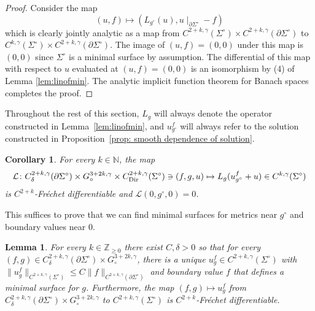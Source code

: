 \documentclass[11pt]{amsart}
\newtheorem{Lemma}[Theorem]{Lemma}
\newtheorem{Corollary}[Theorem]{Corollary}
\theoremstyle{definition}
\numberwithin{equation}{section}
\newcommand{\norm}[1]{\lVert #1 \rVert}         %
\newcommand{\p}{\partial}
\begin{document}
\begin{proof}
Consider the map 
$$(u,f) \mapsto (L_{g^\circ}(u), u\mid_{\partial \Sigma^\circ} - f)$$
which is clearly jointly analytic as a map from $C^{2+k,\gamma}(\Sigma^\circ)\times C^{2+k,\gamma}(\partial \Sigma^\circ)$ to $C^{k,\gamma}(\Sigma^\circ)\times C^{2+k,\gamma}(\partial \Sigma^\circ)$. The image of $(u,f) = (0,0)$ under this map is $(0,0)$ since $\Sigma^\circ$ is a minimal surface by assumption. The differential of this map with respect to $u$ evaluated at $(u,f) = (0,0)$ is an isomorphism by (4) of Lemma \ref{lem:linofmin}. The analytic implicit function theorem for Banach spaces \cite[p. 1081]{zbMATH03230715} completes the proof.
\end{proof}


Throughout the rest of this section, $L_{g}$ will always denote the operator constructed in Lemma~\ref{lem:linofmin}, and $u^f_{g^\circ}$ will always refer to the solution constructed in Proposition~\ref{prop: smooth dependence of solution}. 
\begin{Corollary}
\label{cor: functional is smooth}
For every $k\in\mathbb{N}$, the map
	\[
		\mathcal{L} \colon C^{2+k,\gamma}_{\delta}(\partial\Sigma^\circ) \times G^{3+2k,\gamma}_\circ \times C_{\rm Dir}^{2+k,\gamma}(\Sigma^\circ) \ni (f, g, u) \mapsto L_{g}(u_{g^\circ}^f + u)\in C^{k,\gamma}(\Sigma^\circ)
	\]
	is $C^{2+k}$-Fr\'echet differentiable and $\mathcal L(0, g^\circ, 0)=0$.
\end{Corollary}

This suffices to prove that we can find minimal surfaces for metrics near $g^\circ$ and boundary values near $0$.
\begin{Lemma}
\label{lem: smooth dependence of sol}
For every $k\in\mathbb{Z}_{\geq 0}$ there exist $C,\delta>0$ so that for every $(f,g)\in C^{2+k,\gamma}_{\delta}(\partial\Sigma^\circ) \times G^{3+2k,\gamma}_\circ$, there is a unique $u^f_{g} \in C^{2+k,\gamma}(\Sigma^\circ)$ with $\norm{u^f_{g}}_{C^{2+k,\gamma}(\Sigma^\circ)}\leq C\norm{f}_{C^{2+k,\gamma}(\p\Sigma^\circ)}$ and boundary value $f$ that defines a minimal surface for $g$. Furthermore, the map $(f,g) \mapsto u^f_{g}$ from $C^{2+k,\gamma}_{\delta}(\partial\Sigma^\circ) \times G^{3+2k,\gamma}_\circ$ to $C^{2+k,\gamma}(\Sigma^\circ)$ 
is $C^{2+k}$-Fr\'echet differentiable.
\end{Lemma}
\end{document}
